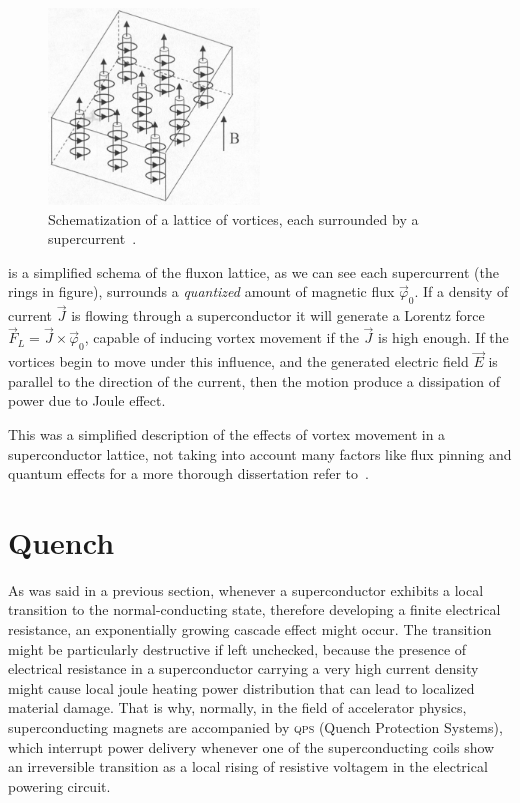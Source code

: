\begin{figure}[!ht]
	\centering
	\includegraphics[width=0.5\textwidth]{./img/Abrikosov_vortices.png}
	\caption{Schematization of a lattice of vortices, each surrounded by a
		supercurrent~\cite{huebener2019}.}
	\label{fig:abrikosov-lattice}
\end{figure}

 is a simplified schema of the fluxon lattice, as we can see each
supercurrent (the rings in figure), surrounds a \emph{quantized} amount of magnetic flux
$\vec{\varphi}_0$. If a density of current $\vec{J}$ is flowing through a superconductor it will generate a Lorentz force $\vec{F}_L = \vec{J} \times \vec{\varphi}_0$, capable of inducing vortex movement if the $\vec{J}$ is high enough. If the vortices begin to move under this influence, and the generated electric field $\vec{E}$ is parallel to the direction of the current, then the motion produce a dissipation of power due to Joule effect.

This was a simplified description of the effects of vortex movement in a superconductor lattice, not
taking into account many factors like flux pinning and quantum effects for a more thorough
dissertation refer to~\cite{huebener2019}.

\section{Quench}
As was said in a previous section, whenever a superconductor exhibits a local transition to the
normal-conducting state, therefore developing a finite electrical resistance, an exponentially
growing cascade effect might occur. The transition might be particularly destructive if left
unchecked, because the presence of electrical resistance in a superconductor carrying a very high
current density might cause local joule heating power distribution that can lead to localized
material damage. That is why, normally, in the field of accelerator physics, superconducting magnets
are accompanied by \textsc{qps} (Quench Protection Systems), which interrupt power delivery whenever
one of the superconducting coils show an irreversible transition as a local rising of resistive
voltagem in the electrical powering circuit.
